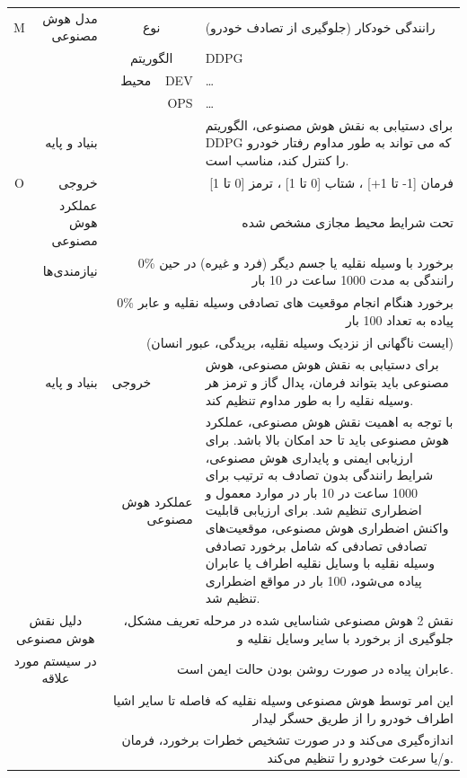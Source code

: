 \documentclass[a4paper,10pt]{article}
\begin{document}
\begin{table}[htbp]
\begin{tabularx}{\textwidth}{c c c c X}
            \multicolumn{1}{c}{M} & \multicolumn{1}{r}{مدل هوش مصنوعی} & \multicolumn{2}{c}{نوع} & رانندگی خودکار (جلوگیری از تصادف خودرو) \\
            &  & \multicolumn{2}{c}{الگوریتم} & DDPG \\
            &  & \multicolumn{1}{r}{محیط} & \multicolumn{1}{r}{DEV} & \dots \\
            &  &  & \multicolumn{1}{r}{OPS} & \dots \\
            & \multicolumn{1}{r}{بنیاد و پایه} &  &  & برای دستیابی به نقش هوش مصنوعی، الگوریتم DDPG که می تواند به طور مداوم رفتار خودرو را کنترل کند، مناسب است. \\

            \multicolumn{1}{c}{O} & \multicolumn{1}{r}{خروجی} & \multicolumn{3}{r}{فرمان [1- تا 1+] ، شتاب [0 تا 1] ، ترمز [0 تا 1]} \\
            & \multicolumn{1}{r}{عملکرد هوش مصنوعی} & \multicolumn{3}{r}{تحت شرایط محیط مجازی مشخص شده} \\
            & \multicolumn{1}{r}{نیازمندی‌ها} & \multicolumn{3}{r}{0\% برخورد با وسیله نقلیه یا جسم دیگر (فرد و غیره) در حین رانندگی به مدت 1000 ساعت در 10 بار} \\
            &  & \multicolumn{3}{r}{0\% برخورد هنگام انجام موقعیت های تصادفی وسیله نقلیه و عابر پیاده به تعداد 100 بار} \\
            &  & \multicolumn{3}{r}{(ایست ناگهانی از نزدیک وسیله نقلیه، بریدگی، عبور انسان)} \\
            & \multicolumn{1}{r}{بنیاد و پایه} & \multicolumn{1}{r}{خروجی} &  & برای دستیابی به نقش هوش مصنوعی، هوش مصنوعی باید بتواند فرمان، پدال گاز و ترمز هر وسیله نقلیه را به طور مداوم تنظیم کند. \\
            &  & \multicolumn{2}{r}{عملکرد هوش مصنوعی} & با توجه به اهمیت نقش هوش مصنوعی، عملکرد هوش مصنوعی باید تا حد امکان بالا باشد. برای ارزیابی ایمنی و پایداری هوش مصنوعی، شرایط رانندگی بدون تصادف به ترتیب برای 1000 ساعت در 10 بار در موارد معمول و اضطراری تنظیم شد. برای ارزیابی قابلیت واکنش اضطراری هوش مصنوعی، موقعیت‌های تصادفی تصادفی که شامل برخورد تصادفی وسیله نقلیه با وسایل نقلیه اطراف یا عابران پیاده می‌شود، 100 بار در مواقع اضطراری تنظیم شد. \\
            
            \multicolumn{2}{c}{دلیل نقش هوش مصنوعی} & \multicolumn{3}{r}{نقش 2 هوش مصنوعی شناسایی شده در مرحله تعریف مشکل، جلوگیری از برخورد با سایر وسایل نقلیه و} \\
            \multicolumn{2}{c}{در سیستم مورد علاقه} & \multicolumn{3}{r}{عابران پیاده در صورت روشن بودن حالت ایمن است.} \\
            \multicolumn{2}{c}{} & \multicolumn{3}{r}{این امر توسط هوش مصنوعی وسیله نقلیه که فاصله تا سایر اشیا اطراف خودرو را از طریق حسگر لیدار} \\
            \multicolumn{2}{c}{} & \multicolumn{3}{r}{اندازه‌گیری می‌کند و در صورت تشخیص خطرات برخورد، فرمان و/یا سرعت خودرو را تنظیم می‌کند.} \\


\end{tabularx}
\end{table}
\end{document}
